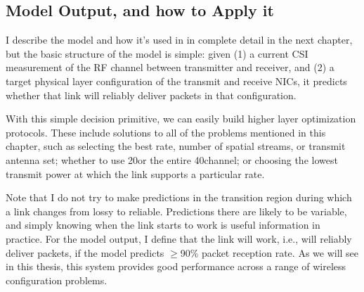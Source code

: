\subsection{Model Output, and how to Apply it}
I describe the model and how it's used in in complete detail in the next chapter, but the basic structure of the model is simple: given (1) a current CSI measurement of the RF channel between transmitter and receiver, and (2) a target physical layer configuration of the transmit and receive NICs, it predicts whether that link will reliably deliver packets in that configuration.

With this simple decision primitive, we can easily build higher layer optimization protocols. These include solutions to all of the problems mentioned in this chapter, such as selecting the best rate, number of spatial streams, or transmit antenna set; whether to use 20\MHz or the entire 40\MHz channel; or choosing the lowest transmit power at which the link supports a particular rate.

Note that I do not try to make predictions in the transition region during which a link changes from lossy to reliable. Predictions there are likely to be variable, and simply knowing when the link starts to work is useful information in practice. For the model output, I define that the link will work, i.e., will reliably deliver packets, if the model predicts $\geq$90\% packet reception rate. As we will see in this thesis, this system provides good performance across a range of wireless configuration problems.



